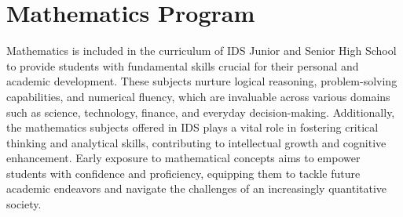 \section{Mathematics Program}
Mathematics is included in the curriculum of IDS Junior and Senior High School to provide students with fundamental skills crucial for their personal and academic development. These subjects nurture logical reasoning, problem-solving capabilities, and numerical fluency, which are invaluable across various domains such as science, technology, finance, and everyday decision-making. Additionally, the mathematics subjects offered in IDS plays a vital role in fostering critical thinking and analytical skills, contributing to intellectual growth and cognitive enhancement. Early exposure to mathematical concepts aims to empower students with confidence and proficiency, equipping them to tackle future academic endeavors and navigate the challenges of an increasingly quantitative society.

